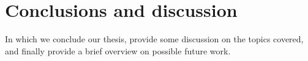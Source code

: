 
\chapter{Conclusions and discussion}\label{chp:conclusions}

In which we conclude our thesis, provide some discussion on the topics covered, and finally provide
a brief overview on possible future work.

